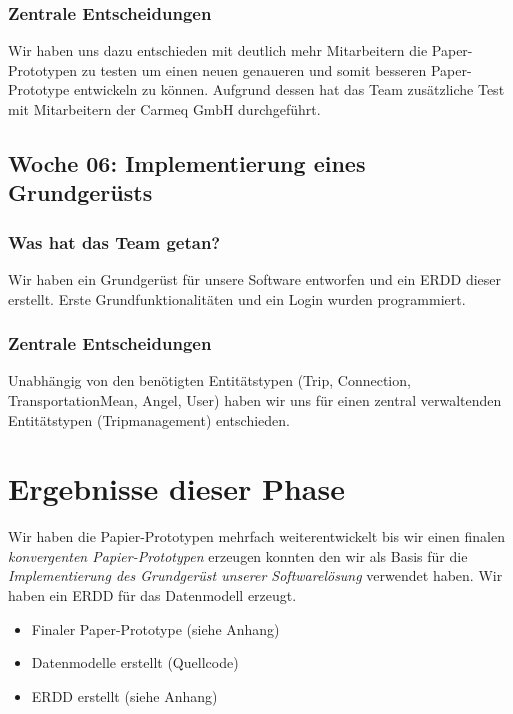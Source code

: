 \documentclass[12pt,a4paper]{article}
\begin{document}
\subsubsection{Zentrale Entscheidungen}

Wir haben uns dazu entschieden mit deutlich mehr Mitarbeitern die Paper-Prototypen zu testen um einen neuen genaueren und somit besseren Paper-Prototype entwickeln zu k\"onnen. Aufgrund dessen hat das Team zus\"atzliche Test mit Mitarbeitern der Carmeq GmbH durchgef\"uhrt.

\subsection{Woche 06: Implementierung eines Grundger\"usts}

\subsubsection{Was hat das Team getan?}

Wir haben ein Grundger\"ust f\"ur unsere Software entworfen und ein ERDD dieser erstellt. Erste Grundfunktionalit\"aten und ein Login wurden programmiert.

\subsubsection{Zentrale Entscheidungen}

Unabh\"angig von den ben\"otigten Entit\"atstypen (Trip, Connection, TransportationMean, Angel, User) haben wir uns f\"ur einen zentral verwaltenden Entit\"atstypen (Tripmanagement) entschieden.

\section*{Ergebnisse dieser Phase}

Wir haben die Papier-Prototypen mehrfach weiterentwickelt bis wir einen finalen \textit{konvergenten Papier-Prototypen} erzeugen konnten den wir als Basis f\"ur die \textit{Implementierung des Grundger\"ust unserer Softwarel\"osung} verwendet haben. Wir haben ein ERDD f\"ur das Datenmodell erzeugt.

\begin{itemize}
\item Finaler Paper-Prototype (siehe Anhang)
\item Datenmodelle erstellt (Quellcode)
\item ERDD erstellt (siehe Anhang)
\end{itemize}
\end{document}
